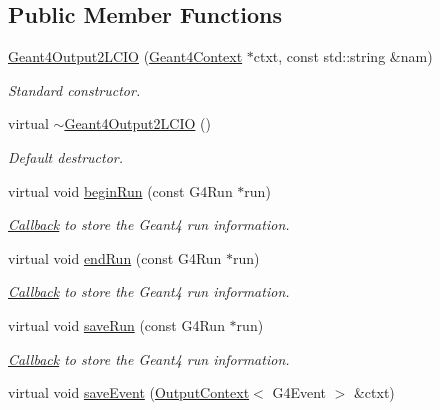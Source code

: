 \subsection*{Public Member Functions}
\begin{DoxyCompactItemize}
\item 
\hyperlink{class_d_d4hep_1_1_simulation_1_1_geant4_output2_l_c_i_o_a39a100c6a5849a6371e646946afe3c43}{Geant4\+Output2\+L\+C\+IO} (\hyperlink{class_d_d4hep_1_1_simulation_1_1_geant4_context}{Geant4\+Context} $\ast$ctxt, const std\+::string \&nam)
\begin{DoxyCompactList}\small\item\em Standard constructor. \end{DoxyCompactList}\item 
virtual \hyperlink{class_d_d4hep_1_1_simulation_1_1_geant4_output2_l_c_i_o_a7d9a334e6ba95f422f8ecf97c0593fa6}{$\sim$\+Geant4\+Output2\+L\+C\+IO} ()
\begin{DoxyCompactList}\small\item\em Default destructor. \end{DoxyCompactList}\item 
virtual void \hyperlink{class_d_d4hep_1_1_simulation_1_1_geant4_output2_l_c_i_o_aebca66a953f5c24b0098b5066fe4c3fc}{begin\+Run} (const G4\+Run $\ast$run)
\begin{DoxyCompactList}\small\item\em \hyperlink{class_d_d4hep_1_1_callback}{Callback} to store the Geant4 run information. \end{DoxyCompactList}\item 
virtual void \hyperlink{class_d_d4hep_1_1_simulation_1_1_geant4_output2_l_c_i_o_a9365b2b05b745a7807ce06163a7977fb}{end\+Run} (const G4\+Run $\ast$run)
\begin{DoxyCompactList}\small\item\em \hyperlink{class_d_d4hep_1_1_callback}{Callback} to store the Geant4 run information. \end{DoxyCompactList}\item 
virtual void \hyperlink{class_d_d4hep_1_1_simulation_1_1_geant4_output2_l_c_i_o_a0fa2240decba857840eed494d6349f5f}{save\+Run} (const G4\+Run $\ast$run)
\begin{DoxyCompactList}\small\item\em \hyperlink{class_d_d4hep_1_1_callback}{Callback} to store the Geant4 run information. \end{DoxyCompactList}\item 
virtual void \hyperlink{class_d_d4hep_1_1_simulation_1_1_geant4_output2_l_c_i_o_a86749213718dcb1ed4783ab86a374d92}{save\+Event} (\hyperlink{class_d_d4hep_1_1_simulation_1_1_geant4_output_action_1_1_output_context}{Output\+Context}$<$ G4\+Event $>$ \&ctxt)

\end{DoxyCompactItemize}

